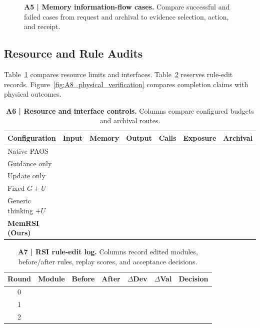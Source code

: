 \begin{figure}[t]
\centering
{}
\caption{\textbf{A5 | Memory information-flow cases.}
Compare successful and failed cases from request
and archival to evidence selection, action, and receipt.}
\label{fig:A5_info_flow}
\end{figure}

\subsection{Resource and Rule Audits}

Table~\ref{tab:A6_budget_parity} compares resource limits
and interfaces. Table~\ref{tab:A7_rule_edit_log}
reserves rule-edit records.
Figure~\ref{fig:A8_physical_verification}
compares completion claims with physical outcomes.

\begin{table}[t]
\centering
\caption{\textbf{A6 | Resource and interface controls.}
Columns compare configured budgets and archival routes.}
\label{tab:A6_budget_parity}
\small
\setlength{\tabcolsep}{7pt}
\renewcommand{\arraystretch}{1.16}
\begin{tabular}{@{}lcccccc@{}}
\toprule
\rowcolor{cvprblue!8}
\textbf{Configuration}
& \textbf{Input}
& \textbf{Memory}
& \textbf{Output}
& \textbf{Calls}
& \textbf{Exposure}
& \textbf{Archival} \\
\midrule
Native PAOS & & & & & & \\
Guidance only & & & & & & \\
Update only & & & & & & \\
Fixed $G+U$ & & & & & & \\
Generic thinking $+U$ & & & & & & \\
\midrule
\rowcolor{red!5}
\textbf{MemRSI (Ours)} & & & & & & \\
\bottomrule
\end{tabular}
\end{table}

\begin{table}[t]
\centering
\caption{\textbf{A7 | RSI rule-edit log.}
Columns record edited modules, before/after rules,
replay scores, and acceptance decisions.}
\label{tab:A7_rule_edit_log}
\small
\setlength{\tabcolsep}{7pt}
\renewcommand{\arraystretch}{1.16}
\begin{tabular}{@{}ccllccc@{}}
\toprule
\rowcolor{cvprblue!8}
\textbf{Round}
& \textbf{Module}
& \textbf{Before}
& \textbf{After}
& \textbf{$\Delta$Dev}
& \textbf{$\Delta$Val}
& \textbf{Decision} \\
\midrule
0 & & & & & & \\
1 & & & & & & \\
2 & & & & & & \\
\bottomrule
\end{tabular}
\end{table}

